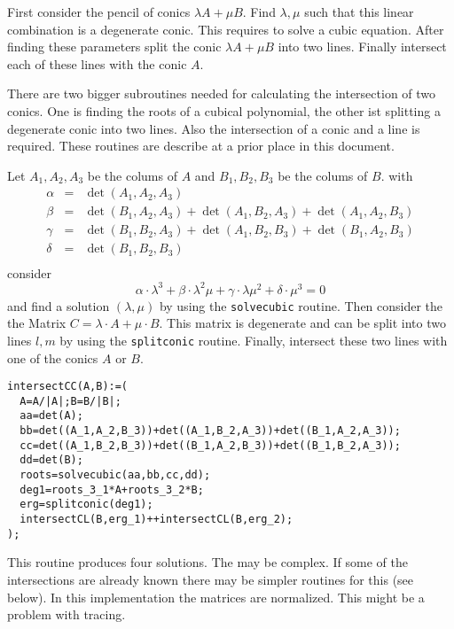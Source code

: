 \documentclass[11pt]{article}
\newcounter{subsubsubsection}[subsubsection]
\begin{document}

\medskip
{}
First consider the pencil of conics $\lambda A+\mu B$. Find $\lambda,\mu$ such that this linear combination is a degenerate conic.
This requires to solve a cubic equation. After finding these parameters split the conic  $\lambda A+\mu B$ into two lines. Finally intersect each of these lines with the conic $A$.

\medskip
{}

There are two bigger subroutines needed for calculating the intersection of two conics.
One is finding the roots of a cubical polynomial, the other ist splitting a degenerate conic into two lines.
Also the intersection of a conic and a line is required.
These routines are describe at a prior place in this document. 

Let $A_1,A_2,A_3$ be the colums of $A$ and
 $B_1,B_2,B_3$ be the colums of $B$.
 with 
 \[
 \begin{array}{rcl}
 \alpha&=&\det(A_1,A_2,A_3)\\[2mm]
 \beta&=&\det(B_1,A_2,A_3)+\det(A_1,B_2,A_3)+\det(A_1,A_2,B_3)\\[2mm]
 \gamma&=&\det(B_1,B_2,A_3)+\det(A_1,B_2,B_3)+\det(B_1,A_2,B_3)\\[2mm]
 \delta&=&\det(B_1,B_2,B_3)\\
 \end{array}
 \]
 consider
 \[
 \alpha\cdot\lambda^3+
 \beta\cdot\lambda^2\mu+
 \gamma\cdot\lambda\mu^2+
 \delta\cdot\mu^3=0
 \]
and find a solution $(\lambda,\mu)$ by using the {\tt solvecubic} routine. Then consider the
the Matrix $C=\lambda\cdot A+\mu\cdot B$. This matrix is degenerate and can be split into two lines
$l, m$ by using the  {\tt splitconic} routine.
Finally, intersect these two lines with one of the conics $A$ or $B$.

\medskip
{}

\begin{verbatim}
intersectCC(A,B):=(
  A=A/|A|;B=B/|B|;
  aa=det(A);    
  bb=det((A_1,A_2,B_3))+det((A_1,B_2,A_3))+det((B_1,A_2,A_3));
  cc=det((A_1,B_2,B_3))+det((B_1,A_2,B_3))+det((B_1,B_2,A_3));
  dd=det(B);
  roots=solvecubic(aa,bb,cc,dd);
  deg1=roots_3_1*A+roots_3_2*B;
  erg=splitconic(deg1);
  intersectCL(B,erg_1)++intersectCL(B,erg_2);
);
\end{verbatim}
This routine produces four solutions. The may be complex.
If some of the intersections are already known there may be simpler routines for this (see below).
In this implementation the matrices are normalized. This might be a problem with tracing.
\end{document}

